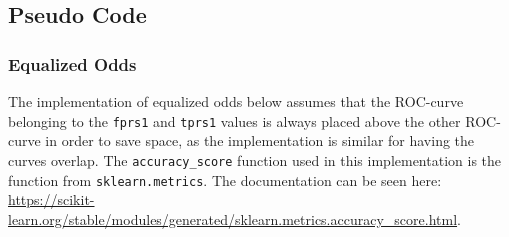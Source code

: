 \documentclass[11pt, fleqn, titlepage]{article}
\begin{document}
	\subsection{Pseudo Code}
	\subsubsection{Equalized Odds}\label{Pseudo Equalized}
	The implementation of equalized odds below assumes that the ROC-curve belonging to the \texttt{fprs1} and \texttt{tprs1} values is always placed above the other ROC-curve in order to save space, as the implementation is similar for having the curves overlap. The \texttt{accuracy\_score} function used in this implementation is the function from \texttt{sklearn.metrics}. The documentation can be seen here: \url{https://scikit-learn.org/stable/modules/generated/sklearn.metrics.accuracy_score.html}.
\end{document}
